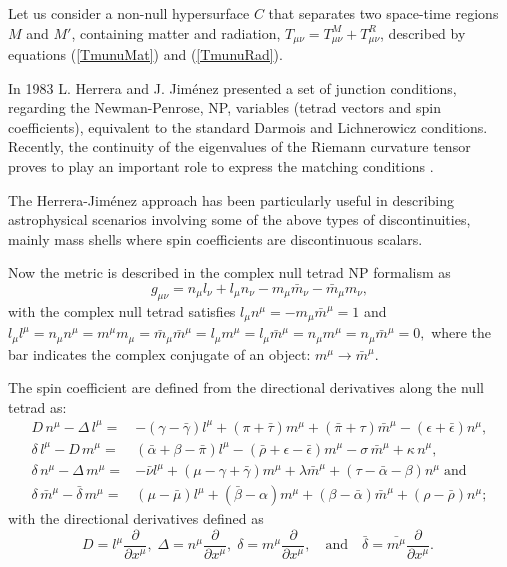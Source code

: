 \documentclass[notitlepage,letterpaper, 10pt]{article}
\begin{document}
Let us consider a non-null hypersurface $C$ that separates two space-time regions $M$ and $M'$, containing matter and radiation, $T_{\mu\nu} = T_{\mu\nu}^{M} + T_{\mu\nu}^{R}$, described by equations (\ref{TmunuMat}) and (\ref{TmunuRad}).

In 1983 L. Herrera and J. Jim\'enez \cite{HerreraJimenez1983} presented a set of junction conditions, regarding the Newman-Penrose, NP, variables (tetrad vectors and spin coefficients)\cite{NewmanPenrose1962}, equivalent to the standard Darmois\cite{Darmois1927} and Lichnerowicz\cite{Lichnerowicz1955} conditions. Recently, the continuity of the eigenvalues of the Riemann curvature tensor proves to play an important role to express the matching conditions \cite{GutierrezQuevedo2019}.     

The Herrera-Jim\'enez approach has been particularly useful in describing astrophysical scenarios involving some of the above types of discontinuities, mainly mass shells where spin coefficients are discontinuous scalars\cite{HerreraEtal1987, HerreraIbanez1989, EsculpiHerrera1994}. 

Now the metric is described in the complex null tetrad NP formalism as
\begin{equation}
g_{\mu \nu}=  n_{\mu } l_{\nu}+ l_{\mu }n_{\nu} - m_{\mu } \bar{m}_{\nu} - \bar{m}_{\mu }m_{\nu}, 
\label{nulltetrad}
\end{equation}
with the  complex null tetrad satisfies 
$ l_{\mu}n^{\mu}= -m_{\mu} \bar{m}^{\mu}=1 $ and \\
$l_{\mu}l^{\mu}= n_{\mu}n^{\mu}=m^{\mu}m_{\mu }= \bar{m}_{\mu} \bar{m}^{\mu}=l_{\mu}m^{\mu}=l_{\mu}\bar{m}^{\mu}= n_{\mu}m^{\mu}=n_{\mu}\bar{m}^{\mu}=0,$ where the bar indicates the complex conjugate of an object: $m^{\mu} \longrightarrow \bar{m}^{\mu}$.

The spin coefficient are defined from the directional derivatives along the null tetrad  as\cite{NewmanPenrose1962,HerreraJimenez1983}:
\begin{align*}
 D\,n^\mu -\Delta\,l^\mu = &
-(\gamma -\bar{\gamma})l^{\mu} + (\pi + \bar{\tau})m^{\mu} +
(\bar{\pi} + \tau)\bar{m}^{\mu} -(\epsilon +\bar{\epsilon})n^{\mu} , \\
\delta \, l^{\mu} -D \, m^{\mu} = & (\bar{\alpha} +\beta -\bar{\pi}) l^{\mu} 
-(\bar{\rho} +\epsilon -\bar{\epsilon})m^{\mu} -\sigma \,\bar{m}^{\mu} +\kappa \, n^{\mu},  \\
\delta \, n^{\mu} -\Delta \, m^{\mu} = & -\bar{\nu} l^{\mu} 
+(\mu -\gamma +\bar{\gamma})m^{\mu} +\lambda\bar{m}^{\mu} +(\tau -\bar{\alpha} -\beta)n^{\mu} \; \textrm{and} \\
\delta \, \bar{m}^{\mu} - \bar{\delta} \, m^{\mu}  = & (\mu -\bar{\mu} ) l^{\mu} 
+(\bar{\beta} -\alpha)m^{\mu} +(\beta -\bar{\alpha})\bar{m}^{\mu} +(\rho -\bar{\rho})n^{\mu} 
;
\end{align*}
with the directional derivatives defined as
\begin{equation*}
    D = l^{\mu} \frac{\partial}{\partial x^\mu}, \; 
    \Delta = n^{\mu} \frac{\partial}{\partial x^\mu}, \; 
    \delta = m^{\mu} \frac{\partial}{\partial x^\mu}, \quad \textrm{and} \quad 
    \bar{\delta} = \bar{m^{\mu}} \frac{\partial}{\partial x^\mu}. \; 
\end{equation*}
\end{document}

